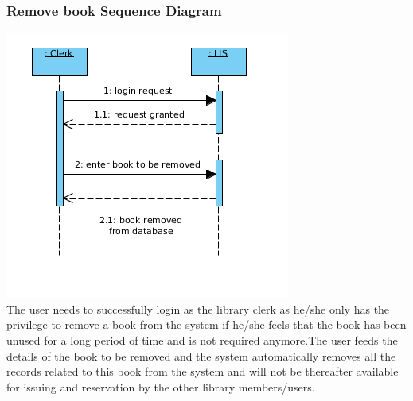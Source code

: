 \documentclass[a4paper]{article}
\begin{document}
\subsubsection*{Remove book Sequence Diagram}
\includegraphics[scale=0.50]{images/seqDiagBookRemoval.png}
\\
The user needs to successfully login as the library clerk as he/she only has the privilege to remove a book from the system if he/she feels that the book has been unused for a long period of time and is not required anymore.The user feeds the details of the book to be removed and the system automatically removes all the records related to this book from the system and will not be thereafter available for issuing and reservation by the other library members/users.
\\
\end{document}
